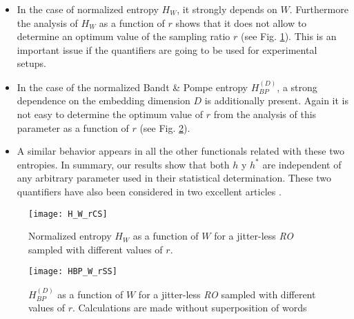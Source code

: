 \begin{itemize}
\item In the case of normalized entropy $H_{W}$, it strongly depends on $W$. Furthermore the analysis of $H_{W}$ as a function of $r$ shows that it does not allow to determine an optimum value of the sampling ratio $r$ (see Fig. \ref{fig:H_W_rCS}). This is an important issue if the quantifiers are going to be used for experimental setups. 
\item In the case of the normalized Bandt \& Pompe entropy $H^{(D)}_{BP}$, a strong dependence on the embedding dimension $D$ is additionally present. Again it is not easy to determine the optimum value of $r$ from the analysis of this parameter as a function of $r$  (see Fig. \ref{fig:HBP_W_rSS}). 
\item A similar behavior appears in all the other functionals related with these two entropies. 
In summary, our results show that  both $ h$ y $h^*$ are independent of any arbitrary parameter used in their statistical determination.  These two quantifiers have also been considered in two excellent articles \cite{Amigo2006,Ebeling2001}. 
\end{itemize}
%
\begin{figure}
\center
\texttt{[image: H\_W\_rCS]}
\caption{Normalized entropy $H_W$ as a function of $W$ for a jitter-less \emph{RO} sampled with different values of $r$.}
\label{fig:H_W_rCS}
\end{figure}
%
\begin{figure}
\center
\texttt{[image: HBP\_W\_rSS]}
\caption{$H^{(D)}_{BP}$ as a function of $W$ for a jitter-less \emph{RO} sampled with different values of $r$. Calculations are made without superposition of words}
\label{fig:HBP_W_rSS}
\end{figure}

